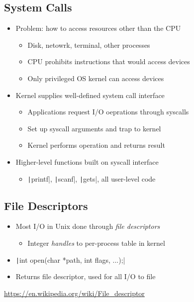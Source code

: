\subsection{System Calls}
\begin{itemize}[nosep]
    \item Problem: how to access resources other than the CPU
          \begin{itemize}[nosep]
              \item Disk, netowrk, terminal, other processes
              \item CPU prohibits instructions that would access devices
              \item Only privileged OS kernel can access devices
          \end{itemize}
    \item Kernel supplies well-defined system call interface
          \begin{itemize}[nosep]
              \item Applications request I/O oeprations through syscalls
              \item Set up syscall arguments and trap to kernel
              \item Kernel performs operation and returns result
          \end{itemize}
    \item Higher-level functions built on syscall interface
          \begin{itemize}[nosep]
              \item \texttt|printf|, \texttt|scanf|, \texttt|gets|, all user-level code
          \end{itemize}
\end{itemize}
\subsection{File Descriptors}
\begin{itemize}[nosep]
    \item Most I/O in Unix done through \emph{file descriptors}
          \begin{itemize}[nosep]
              \item Integer \emph{handles} to per-process table in kernel
          \end{itemize}
    \item \texttt|int open(char *path, int flags, ...);|
    \item Returns file descriptor, used for all I/O to file
\end{itemize}
\url{https://en.wikipedia.org/wiki/File_descriptor}

